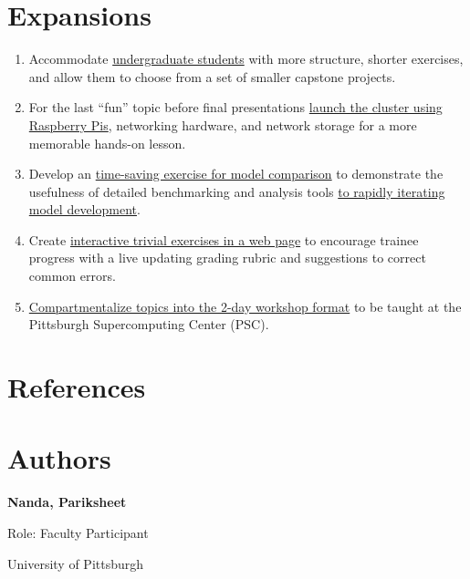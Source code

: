 \documentclass[
portrait,
custom
]{sciposter}
\begin{document}
\begin{multicols}{2}
  \section*{Expansions}
  \begin{multicols}{2}
    \begin{enumerate}
    \item Accommodate \ul{undergraduate students} %
      with more structure, %
      shorter exercises, %
      and allow them to choose from a set of smaller capstone projects.
    \item For the last ``fun'' topic before final presentations %
      \ul{launch the cluster using Raspberry Pis}, %
      networking hardware, and network storage %
      for a more memorable hands-on lesson.
    \item Develop an \ul{time-saving exercise for model comparison} %
      to demonstrate the usefulness %
      of detailed benchmarking and analysis tools %
      \ul{to rapidly iterating model development}.
    \item Create \ul{interactive trivial exercises in a web page} %
      to encourage trainee progress with %
      a live updating grading rubric %
      and suggestions to correct common errors.
    \item \ul{Compartmentalize topics %
      into the 2-day workshop format} %
      to be taught at the Pittsburgh Supercomputing Center (PSC).
    \end{enumerate}
  \end{multicols}

  \section*{References}
  {
    \setlength{\columnsep}{1.5pc}
    \begin{multicols}{2}
      \printbibliography[heading=none]{}
    \end{multicols}
  }

  \section*{Authors}
  {
    \setlength{\parindent}{5em}

    \textbf{\textcolor{fh-blue}{Nanda, Pariksheet}}

    Role: Faculty Participant

    University of Pittsburgh

}
\end{multicols}
\end{document}
